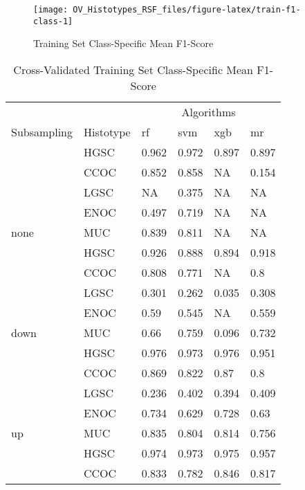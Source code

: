 \documentclass[
]{report}
\begin{document}
\begin{figure}[H]

{\centering \texttt{[image: OV\_Histotypes\_RSF\_files/figure-latex/train-f1-class-1]} 

}

\caption{Training Set Class-Specific Mean F1-Score}\label{fig:train-f1-class}
\end{figure}

\begin{table}

\caption{\label{tab:train-f1-class-table}Cross-Validated Training Set Class-Specific Mean F1-Score}
\centering
\begin{tabular}[t]{l|l|l|l|l|l}
\hline
\multicolumn{2}{c|}{ } & \multicolumn{4}{c}{Algorithms} \\
\cline{3-6}
Subsampling & Histotype & rf & svm & xgb & mr\\
\hline
 & HGSC & 0.962 & 0.972 & 0.897 & 0.897\\
\cline{2-6}
 & CCOC & 0.852 & 0.858 & NA & 0.154\\
\cline{2-6}
 & LGSC & NA & 0.375 & NA & NA\\
\cline{2-6}
 & ENOC & 0.497 & 0.719 & NA & NA\\
\cline{2-6}
\multirow{-5}{*}{\raggedright\arraybackslash none} & MUC & 0.839 & 0.811 & NA & NA\\
\cline{1-6}
 & HGSC & 0.926 & 0.888 & 0.894 & 0.918\\
\cline{2-6}
 & CCOC & 0.808 & 0.771 & NA & 0.8\\
\cline{2-6}
 & LGSC & 0.301 & 0.262 & 0.035 & 0.308\\
\cline{2-6}
 & ENOC & 0.59 & 0.545 & NA & 0.559\\
\cline{2-6}
\multirow{-5}{*}{\raggedright\arraybackslash down} & MUC & 0.66 & 0.759 & 0.096 & 0.732\\
\cline{1-6}
 & HGSC & 0.976 & 0.973 & 0.976 & 0.951\\
\cline{2-6}
 & CCOC & 0.869 & 0.822 & 0.87 & 0.8\\
\cline{2-6}
 & LGSC & 0.236 & 0.402 & 0.394 & 0.409\\
\cline{2-6}
 & ENOC & 0.734 & 0.629 & 0.728 & 0.63\\
\cline{2-6}
\multirow{-5}{*}{\raggedright\arraybackslash up} & MUC & 0.835 & 0.804 & 0.814 & 0.756\\
\cline{1-6}
 & HGSC & 0.974 & 0.973 & 0.975 & 0.957\\
\cline{2-6}
 & CCOC & 0.833 & 0.782 & 0.846 & 0.817\\

\end{tabular}
\end{table}
\end{document}
